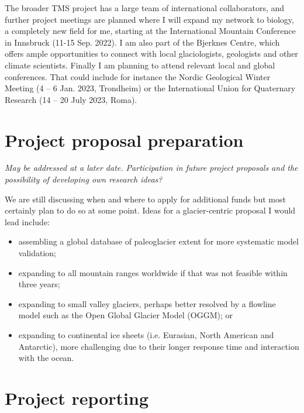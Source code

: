 \documentclass{article}
\newcommand{\guideline}[1]{{\color{color2}\itshape{#1}}}
\begin{document}
    The broader TMS project has a large team of international collaborators,
    and further project meetings are planned where I will expand my network to
    biology, a completely new field for me, starting at the International
    Mountain Conference in Innsbruck (11-15 Sep. 2022). I am also part of the
    Bjerknes Centre, which offers ample opportunities to connect with local
    glaciologists, geologists and other climate scientists. Finally I am
    planning to attend relevant local and global conferences. That could
    include for instance the Nordic Geological Winter Meeting (4 – 6 Jan. 2023,
    Trondheim) or the International Union for Quaternary Research (14 – 20 July
    2023, Roma).


\section{Project proposal preparation}

    \guideline{
        May be addressed at a later date. Participation in future project
        proposals and the possibility of developing own research ideas?}

    We are still discussing when and where to apply for additional funds but
    most certainly plan to do so at some point. Ideas for a glacier-centric
    proposal I would lead include:

    \begin{itemize}
      \item assembling a global database of paleoglacier extent for more
        systematic model validation;
      \item expanding to all mountain ranges worldwide if that was not feasible
        within three years;
      \item expanding to small valley glaciers, perhaps better resolved by
        a flowline model such as the Open Global Glacier Model (OGGM); or
      \item expanding to continental ice sheets (i.e. Eurasian, North American
        and Antarctic), more challenging due to their longer response time and
        interaction with the ocean.
    \end{itemize}


\section{Project reporting}
\end{document}
